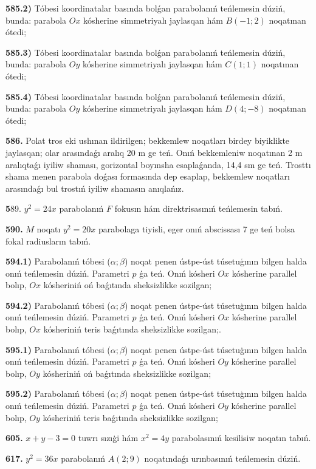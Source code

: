 \textbf{585.2)} Tóbesi koordinatalar basında bolǵan parabolanıń teńlemesin dúziń, bunda: parabola $Ox$ kósherine simmetriyalı jaylasqan hám $B (-1; 2) $ noqatınan ótedi;

\textbf{585.3)} Tóbesi koordinatalar basında bolǵan parabolanıń teńlemesin dúziń, bunda: parabola $Oy$ kósherine simmetriyalı jaylasqan hám $C (1; 1) $ noqatınan ótedi;

\textbf{585.4)} Tóbesi koordinatalar basında bolǵan parabolanıń teńlemesin dúziń, bunda: parabola $Oy$ kósherine simmetriyalı jaylasqan hám $D (4; -8) $ noqatınan ótedi;

\textbf{586.} Polat tros eki ushınan ildirilgen; bekkemlew noqatları birdey biyiklikte jaylasqan; olar arasındaǵı aralıq 20 m ge teń. Onıń bekkemleniw noqatınan 2 m aralıqtaǵı iyiliw shaması, gorizontal boyınsha esaplaǵanda, 14,4 sm ge teń. Trosttı shama menen parabola doǵası formasında dep esaplap, bekkemlew noqatları arasındaǵı bul trostıń iyiliw shamasın anıqlańız.

\textbf589. $y^2=24 x$ parabolanıń $F$ fokusın hám direktrisasınıń teńlemesin tabıń.

\textbf{590.} $M$ noqatı $y^2=20 x$ parabolaga tiyisli, eger onıń abscissası 7 ge teń bolsa fokal radiusların tabıń.

\textbf{594.1) } Parabolanıń tóbesi ($\alpha;\beta$) noqat penen ústpe-úst túsetuģının bilgen halda onıń teńlemesin dúziń. Parametri $p$ ǵa teń. Onıń kósheri $O x$ kósherine parallel bolıp, $O x$ kósheriniń oń baǵıtında sheksizlikke sozilgan;

\textbf{594.2)} Parabolanıń tóbesi ($\alpha;\beta$) noqat penen ústpe-úst túsetuģının bilgen halda onıń teńlemesin dúziń. Parametri $p$ ǵa teń. Onıń kósheri $O x$ kósherine parallel bolıp, $O x$ kósheriniń teris baǵıtında sheksizlikke sozilgan;.

\textbf{595.1)} Parabolanıń tóbesi ($\alpha;\beta$) noqat penen ústpe-úst túsetuģının bilgen halda onıń teńlemesin dúziń. Parametri $p$ ǵa teń. Onıń kósheri $O y$ kósherine parallel bolıp, $O y$ kósheriniń oń baǵıtında sheksizlikke sozilgan;

\textbf{595.2)} Parabolanıń tóbesi ($\alpha;\beta$) noqat penen ústpe-úst túsetuģının bilgen halda onıń teńlemesin dúziń. Parametri $p$ ǵa teń. Onıń kósheri $O y$ kósherine parallel bolıp, $O y$ kósheriniń teris baǵıtında sheksizlikke sozilgan;

\textbf{605.} $x+y-3=0$ tuwrı sızıģi hám $x^2=4 y$ parabolasınıń kesilisiw noqatın tabıń.

\textbf{617.} $y^2=36 x$ parabolanıń $A (2; 9) $ noqatındaǵı urınbasınıń teńlemesin dúziń.

